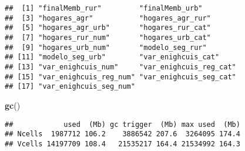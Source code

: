 \documentclass[11pt,]{article}
\newenvironment{Shaded}{\begin{snugshade}}{\end{snugshade}}
\newcommand{\KeywordTok}[1]{\textcolor[rgb]{0.13,0.29,0.53}{\textbf{#1}}}
\newcommand{\NormalTok}[1]{#1}
\begin{document}
\begin{verbatim}
##  [1] "finalMemb_rur"         "finalMemb_urb"        
##  [3] "hogares_agr"           "hogares_agr_rur"      
##  [5] "hogares_agr_urb"       "hogares_rur_cat"      
##  [7] "hogares_rur_num"       "hogares_urb_cat"      
##  [9] "hogares_urb_num"       "modelo_seg_rur"       
## [11] "modelo_seg_urb"        "var_enighcuis_cat"    
## [13] "var_enighcuis_num"     "var_enighcuis_reg_cat"
## [15] "var_enighcuis_reg_num" "var_enighcuis_seg_cat"
## [17] "var_enighcuis_seg_num"
\end{verbatim}

\begin{Shaded}
\begin{Highlighting}[]
\KeywordTok{gc}\NormalTok{()}
\end{Highlighting}
\end{Shaded}

\begin{verbatim}
##            used  (Mb) gc trigger  (Mb) max used  (Mb)
## Ncells  1987712 106.2    3886542 207.6  3264095 174.4
## Vcells 14197709 108.4   21535217 164.4 21534992 164.3
\end{verbatim}




\newpage
\singlespacing 
\end{document}
